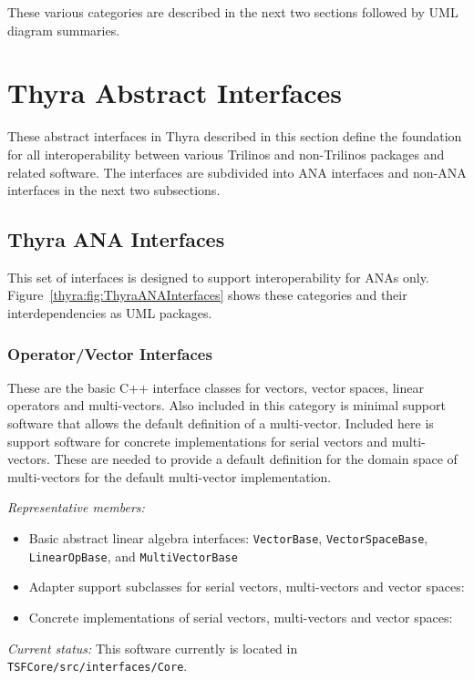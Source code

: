 \documentclass[pdf,ps2pdf,11pt]{SANDreport}
\begin{document}
These various categories are described in the next two sections followed by
UML diagram summaries.

%
\section{Thyra Abstract Interfaces}
%

These abstract interfaces in Thyra described in this section define the
foundation for all interoperability between various Trilinos and non-Trilinos
packages and related software.  The interfaces are subdivided into ANA
interfaces and non-ANA interfaces in the next two subsections.

\subsection{Thyra ANA Interfaces}

This set of interfaces is designed to support interoperability for ANAs only.
Figure~\ref{thyra:fig:ThyraANAInterfaces} shows these categories and their
interdependencies as UML packages.

%
\subsubsection{Operator/Vector Interfaces}
%

These are the basic C++ interface classes for vectors, vector spaces, linear
operators and multi-vectors.  Also included in this category is minimal
support software that allows the default definition of a multi-vector.
Included here is support software for concrete implementations for serial
vectors and multi-vectors.  These are needed to provide a default definition
for the domain space of multi-vectors for the default multi-vector
implementation.

{}\textit{Representative members:}
\begin{itemize}
%
{}\item Basic abstract linear algebra interfaces: {}\texttt{VectorBase},
{}\texttt{VectorSpaceBase}, {}\texttt{LinearOpBase}, and
{}\texttt{MultiVectorBase}
%
{}\item Adapter support subclasses for serial vectors, multi-vectors and
vector spaces:
%
{}\item Concrete implementations of serial vectors, multi-vectors and vector
spaces:
%
\end{itemize}

{}\textit{Current status:} This software currently is located in
{}\texttt{TSFCore/src/interfaces/Core}.
\end{document}
